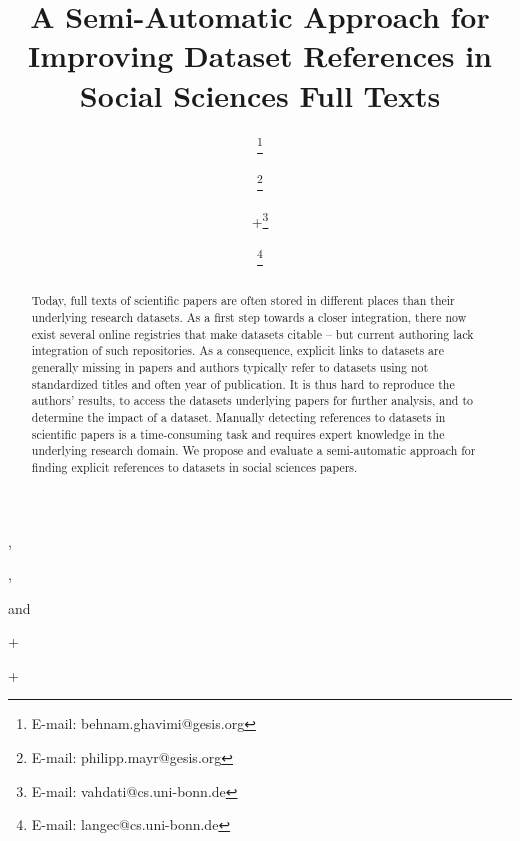 \documentclass{IOS-Book-Article}
\begin{document}
\pagestyle{headings}
\def\thepage{}

\begin{frontmatter}
\title{A Semi-Automatic Approach for Improving Dataset References in Social Sciences Full Texts}

\author[A,B]{ 
\thanks{E-mail: behnam.ghavimi@gesis.org}},
\author[A]{ 
\thanks{E-mail: philipp.mayr@gesis.org}},
\author[B]{ 
+\thanks{E-mail: vahdati@cs.uni-bonn.de}}
and
\author[B,C]{  
\thanks{E-mail: langec@cs.uni-bonn.de}}

\address[A]{GESIS – Leibniz Institute for the Social Sciences}
+\address[B]{Enterprise Information Systems (EIS), University of Bonn}
+\address[C]{Fraunhofer Institute for Intelligent Analysis and Information Systems IAIS}
\begin{abstract}
Today, full texts of scientific papers are often stored in different places than their underlying research datasets.
As a first step towards a closer integration, there now exist several online registries that make datasets citable – but current authoring lack integration of such repositories. 
As a consequence, explicit links to datasets are generally missing in papers and authors typically refer to datasets using not standardized titles and often year of publication.
It is thus hard to reproduce the authors' results, to access the datasets underlying papers for further analysis, and to determine the impact of a dataset.
Manually detecting references to datasets in scientific papers is a time-consuming task and requires expert knowledge in the underlying research domain. 
We propose and evaluate a semi-automatic approach for finding explicit references to datasets in social sciences papers.


\end{abstract}
\end{frontmatter}
\end{document}
